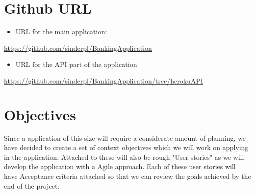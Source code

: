 \section{Github URL}
    \begin{itemize}
    \item URL for the main application:
    \end{itemize}
    \url{https://github.com/sinderpl/BankingApplication}
    \begin{itemize}
    \item URL for the API part of the application
    \end{itemize}
    \url{https://github.com/sinderpl/BankingApplication/tree/herokuAPI}




\section{Objectives}
    Since a application of this size will require a considerate amount of planning, we have decided to create a set of context objectives which we will work on applying in the application. Attached to these will also be rough "User stories" as we will develop the application with a Agile approach.\cite{userStories} Each of these user stories will have Acceptance criteria attached so that we can review the goals achieved by the end of the project.
